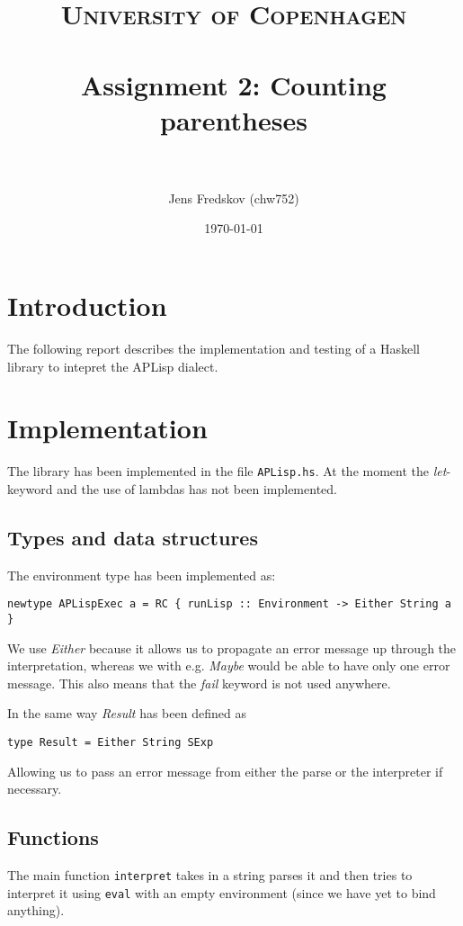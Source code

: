 \documentclass[a4paper, 11pt]{article}
\title{ 
\normalfont\normalsize 
\textsc{University of Copenhagen} \\ [25pt] %
\horrule{0.5pt} \\[0.4cm] %
\huge Assignment 2: Counting parentheses \\ %
\horrule{2pt} \\[0.5cm] %
}
\author{Jens Fredskov (chw752)} %
\date{\normalsize\today} %
\begin{document}
\maketitle

\section{Introduction} %
\label{sec:introduction}

The following report describes the implementation and testing of a Haskell library to intepret the APLisp dialect.


\section{Implementation} %
\label{sec:implementation}

The library has been implemented in the file \texttt{APLisp.hs}. At the moment the \emph{let}-keyword and the use of lambdas has not been implemented.

\subsection{Types and data structures} %
\label{sub:types_and_data_structures}

The environment type has been implemented as:

\begin{verbatim}
newtype APLispExec a = RC { runLisp :: Environment -> Either String a }
\end{verbatim}

We use \emph{Either} because it allows us to propagate an error message up through the interpretation, whereas we with e.g. \emph{Maybe} would be able to have only one error message. This also means that the \emph{fail} keyword is not used anywhere.

In the same way \emph{Result} has been defined as

\begin{verbatim}
type Result = Either String SExp
\end{verbatim}

Allowing us to pass an error message from either the parse or the interpreter if necessary.


\subsection{Functions} %
\label{sub:functions}
The main function \texttt{interpret} takes in a string parses it and then tries to interpret it using \texttt{eval} with an empty environment (since we have yet to bind anything).
\end{document}
